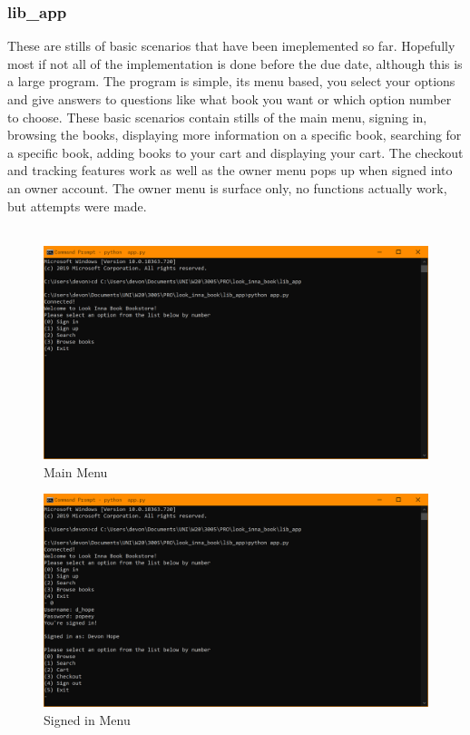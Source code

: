 \documentclass[a4 paper]{article}
\begin{document}
\subsubsection{lib\_app}
These are stills of basic scenarios that have been imeplemented so far. Hopefully most if not all of the implementation is done before the due date, although this is a large program. The program is simple, its menu based, you select your options  and give answers to questions like what book you want or which option number to choose. These basic scenarios contain stills of the main menu, signing in, browsing the books, displaying more information on a specific book, searching for a specific book, adding books to your cart and displaying your cart. The checkout and tracking features work as well as the owner menu pops up when signed into an owner account. The owner menu is surface only, no functions actually work, but attempts were made. \\\\
\begin{figure}
\centering 
\includegraphics[width=\textwidth/1]{scenarios_cmd/Main_menu.png} 
\caption{Main Menu}
\end{figure}
\begin{figure}
\centering 
\includegraphics[width=\textwidth/1]{scenarios_cmd/signed_in_menu.png}
\caption{Signed in Menu}
\end{figure}
\end{document}

